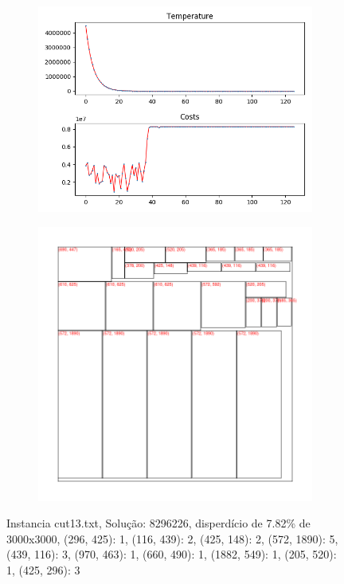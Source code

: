 \begin{figure}
\centering
\begin{subfigure}{.5\textwidth}
  \centering
  \includegraphics[width=1\linewidth]{results/cut13/2/plot}
  \label{fig:sub1}
\end{subfigure}%
\begin{subfigure}{.5\textwidth}
  \centering
  \includegraphics[width=1\linewidth]{results/cut13/2/cut}
  \label{fig:sub2}
\end{subfigure}
\caption{Instancia cut13.txt, Solução: 8296226, disperdício de 7.82\% de 3000x3000, {(296, 425): 1, (116, 439): 2, (425, 148): 2, (572, 1890): 5, (439, 116): 3, (970, 463): 1, (660, 490): 1, (1882, 549): 1, (205, 520): 1, (425, 296): 3}}
\label{fig:test}
\end{figure}


